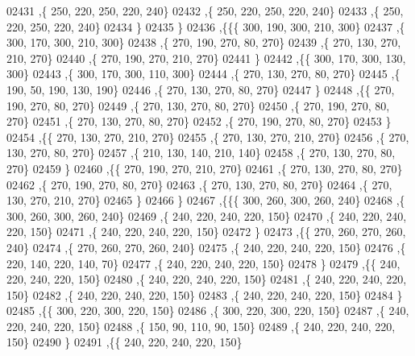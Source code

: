 \begin{DoxyCode}
02431     ,\{   250,   220,   250,   220,   240\}
02432     ,\{   250,   220,   250,   220,   240\}
02433     ,\{   250,   220,   250,   220,   240\}
02434     \}
02435    \}
02436   ,\{\{\{   300,   190,   300,   210,   300\}
02437     ,\{   300,   170,   300,   210,   300\}
02438     ,\{   270,   190,   270,    80,   270\}
02439     ,\{   270,   130,   270,   210,   270\}
02440     ,\{   270,   190,   270,   210,   270\}
02441     \}
02442    ,\{\{   300,   170,   300,   130,   300\}
02443     ,\{   300,   170,   300,   110,   300\}
02444     ,\{   270,   130,   270,    80,   270\}
02445     ,\{   190,    50,   190,   130,   190\}
02446     ,\{   270,   130,   270,    80,   270\}
02447     \}
02448    ,\{\{   270,   190,   270,    80,   270\}
02449     ,\{   270,   130,   270,    80,   270\}
02450     ,\{   270,   190,   270,    80,   270\}
02451     ,\{   270,   130,   270,    80,   270\}
02452     ,\{   270,   190,   270,    80,   270\}
02453     \}
02454    ,\{\{   270,   130,   270,   210,   270\}
02455     ,\{   270,   130,   270,   210,   270\}
02456     ,\{   270,   130,   270,    80,   270\}
02457     ,\{   210,   130,   140,   210,   140\}
02458     ,\{   270,   130,   270,    80,   270\}
02459     \}
02460    ,\{\{   270,   190,   270,   210,   270\}
02461     ,\{   270,   130,   270,    80,   270\}
02462     ,\{   270,   190,   270,    80,   270\}
02463     ,\{   270,   130,   270,    80,   270\}
02464     ,\{   270,   130,   270,   210,   270\}
02465     \}
02466    \}
02467   ,\{\{\{   300,   260,   300,   260,   240\}
02468     ,\{   300,   260,   300,   260,   240\}
02469     ,\{   240,   220,   240,   220,   150\}
02470     ,\{   240,   220,   240,   220,   150\}
02471     ,\{   240,   220,   240,   220,   150\}
02472     \}
02473    ,\{\{   270,   260,   270,   260,   240\}
02474     ,\{   270,   260,   270,   260,   240\}
02475     ,\{   240,   220,   240,   220,   150\}
02476     ,\{   220,   140,   220,   140,    70\}
02477     ,\{   240,   220,   240,   220,   150\}
02478     \}
02479    ,\{\{   240,   220,   240,   220,   150\}
02480     ,\{   240,   220,   240,   220,   150\}
02481     ,\{   240,   220,   240,   220,   150\}
02482     ,\{   240,   220,   240,   220,   150\}
02483     ,\{   240,   220,   240,   220,   150\}
02484     \}
02485    ,\{\{   300,   220,   300,   220,   150\}
02486     ,\{   300,   220,   300,   220,   150\}
02487     ,\{   240,   220,   240,   220,   150\}
02488     ,\{   150,    90,   110,    90,   150\}
02489     ,\{   240,   220,   240,   220,   150\}
02490     \}
02491    ,\{\{   240,   220,   240,   220,   150\}

\end{DoxyCode}
